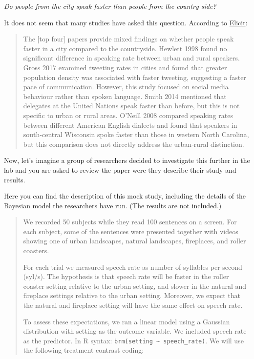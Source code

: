 \documentclass[
]{article}
\begin{document}
\emph{Do people from the city speak faster than people from the country
side?}

It does not seem that many studies have asked this question. According
to \href{elicit.com}{Elicit}:

\begin{quote}
The {[}top four{]} papers provide mixed findings on whether people speak
faster in a city compared to the countryside. Hewlett 1998 found no
significant difference in speaking rate between urban and rural
speakers. Gross 2017 examined tweeting rates in cities and found that
greater population density was associated with faster tweeting,
suggesting a faster pace of communication. However, this study focused
on social media behaviour rather than spoken language. Smith 2014
mentioned that delegates at the United Nations speak faster than before,
but this is not specific to urban or rural areas. O'Neill 2008 compared
speaking rates between different American English dialects and found
that speakers in south-central Wisconsin spoke faster than those in
western North Carolina, but this comparison does not directly address
the urban-rural distinction.
\end{quote}

Now, let's imagine a group of researchers decided to investigate this
further in the lab and you are asked to review the paper were they
describe their study and results.

Here you can find the description of this mock study, including the
details of the Bayesian model the researchers have run. (The results are
not included.)

\begin{quote}
We recorded 50 subjects while they read 100 sentences on a screen. For
each subject, some of the sentences were presented together with videos
showing one of urban landscapes, natural landscapes, fireplaces, and
roller coasters.

For each trial we measured speech rate as number of syllables per second
(syl/s). The hypothesis is that speech rate will be faster in the roller
coaster setting relative to the urban setting, and slower in the natural
and fireplace settings relative to the urban setting. Moreover, we
expect that the natural and fireplace setting will have the same effect
on speech rate.

To assess these expectations, we ran a linear model using a Gaussian
distribution with setting as the outcome variable. We included speech
rate as the predictor. In R syntax:
\texttt{brm(setting\ \textasciitilde{}\ speech\_rate)}. We will use the
following treatment contrast coding:
\end{quote}
\end{document}
